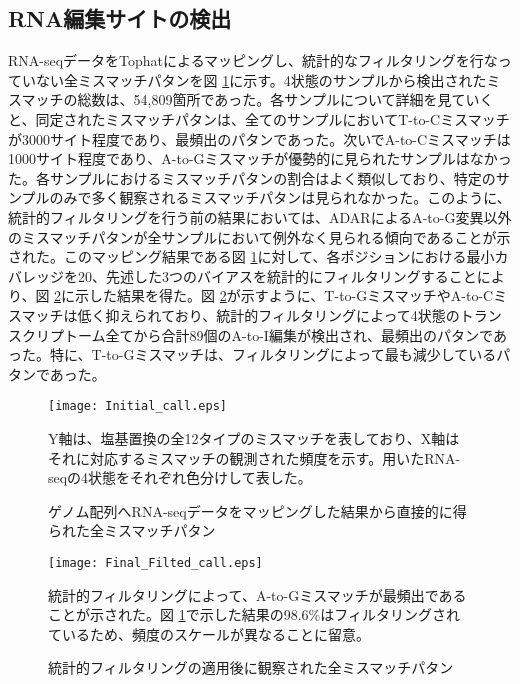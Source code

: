 \subsection{RNA編集サイトの検出}
RNA-seqデータをTophatによるマッピングし、統計的なフィルタリングを行なっていない全ミスマッチパタンを図 \ref{fig:initial}に示す。4状態のサンプルから検出されたミスマッチの総数は、54,809箇所であった。各サンプルについて詳細を見ていくと、同定されたミスマッチパタンは、全てのサンプルにおいてT-to-Cミスマッチが3000サイト程度であり、最頻出のパタンであった。次いでA-to-Cミスマッチは1000サイト程度であり、A-to-Gミスマッチが優勢的に見られたサンプルはなかった。各サンプルにおけるミスマッチパタンの割合はよく類似しており、特定のサンプルのみで多く観察されるミスマッチパタンは見られなかった。このように、統計的フィルタリングを行う前の結果においては、ADARによるA-to-G変異以外のミスマッチパタンが全サンプルにおいて例外なく見られる傾向であることが示された。このマッピング結果である図 \ref{fig:initial}に対して、各ポジションにおける最小カバレッジを20、先述した3つのバイアスを統計的にフィルタリングすることにより、図 \ref{fig:final}に示した結果を得た。図 \ref{fig:final}が示すように、T-to-GミスマッチやA-to-Cミスマッチは低く抑えられており、統計的フィルタリングによって4状態のトランスクリプトーム全てから合計89個のA-to-I編集が検出され、最頻出のパタンであった。特に、T-to-Gミスマッチは、フィルタリングによって最も減少しているパタンであった。
\begin{figure}[!h]
	\centering
		\texttt{[image: Initial\_call.eps]}
		\caption{ゲノム配列へRNA-seqデータをマッピングした結果から直接的に得られた全ミスマッチパタン}
		\begin{flushleft}
			\small{Y軸は、塩基置換の全12タイプのミスマッチを表しており、X軸はそれに対応するミスマッチの観測された頻度を示す。用いたRNA-seqの4状態をそれぞれ色分けして表した。}
		\end{flushleft}
		\label{fig:initial}
	\end{figure}
\begin{figure}[!h]
	\centering
	\texttt{[image: Final\_Filted\_call.eps]}
	\caption{統計的フィルタリングの適用後に観察された全ミスマッチパタン}
	\begin{flushleft}
		\small{統計的フィルタリングによって、A-to-Gミスマッチが最頻出であることが示された。図 \ref{fig:initial}で示した結果の98.6\%はフィルタリングされているため、頻度のスケールが異なることに留意。}
	\end{flushleft}
	\label{fig:final}
\end{figure}


